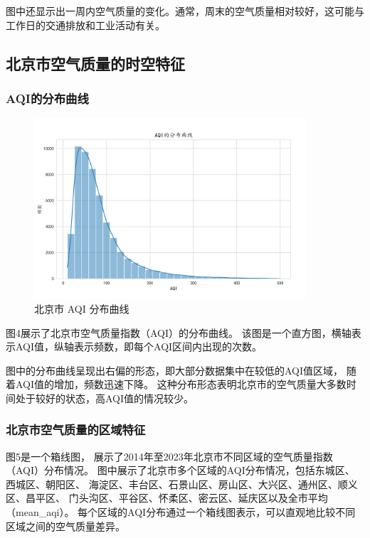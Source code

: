 \documentclass[12pt, a4paper, oneside]{ctexart}
\begin{document}
图中还显示出一周内空气质量的变化。通常，周末的空气质量相对较好，这可能与工作日的交通排放和工业活动有关。

\subsection{北京市空气质量的时空特征}
\subsubsection{AQI的分布曲线}
\begin{figure}
    \centering
    \includegraphics[width=0.9\textwidth]{Outputs/AQI的分布曲线.png}
    \caption{北京市 AQI 分布曲线}
    \label{fig:AQI_distribution}
\end{figure}

图4展示了北京市空气质量指数（AQI）的分布曲线。
该图是一个直方图，横轴表示AQI值，纵轴表示频数，即每个AQI区间内出现的次数。

图中的分布曲线呈现出右偏的形态，即大部分数据集中在较低的AQI值区域，
随着AQI值的增加，频数迅速下降。
这种分布形态表明北京市的空气质量大多数时间处于较好的状态，高AQI值的情况较少。

\subsubsection{北京市空气质量的区域特征}

图5是一个箱线图，
展示了2014年至2023年北京市不同区域的空气质量指数（AQI）分布情况。
图中展示了北京市多个区域的AQI分布情况，包括东城区、西城区、朝阳区、
海淀区、丰台区、石景山区、房山区、大兴区、通州区、顺义区、昌平区、
门头沟区、平谷区、怀柔区、密云区、延庆区以及全市平均（mean\_aqi）。
每个区域的AQI分布通过一个箱线图表示，可以直观地比较不同区域之间的空气质量差异。
\end{document}
